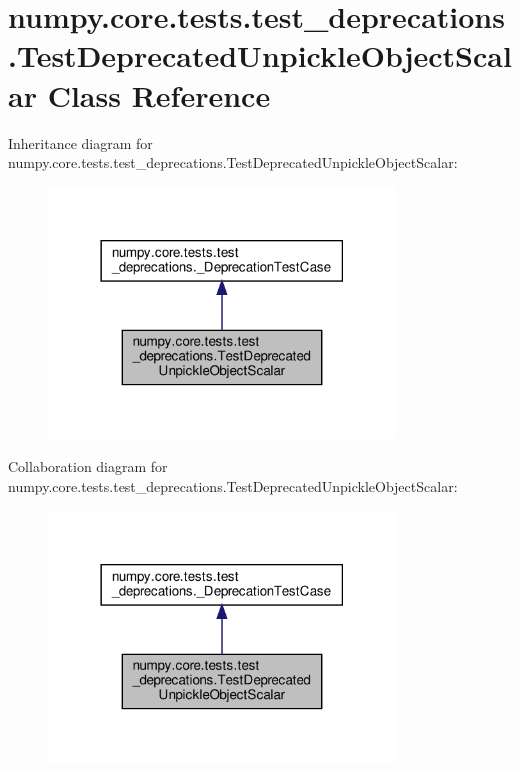 \hypertarget{classnumpy_1_1core_1_1tests_1_1test__deprecations_1_1TestDeprecatedUnpickleObjectScalar}{}\section{numpy.\+core.\+tests.\+test\+\_\+deprecations.\+Test\+Deprecated\+Unpickle\+Object\+Scalar Class Reference}
\label{classnumpy_1_1core_1_1tests_1_1test__deprecations_1_1TestDeprecatedUnpickleObjectScalar}


Inheritance diagram for numpy.\+core.\+tests.\+test\+\_\+deprecations.\+Test\+Deprecated\+Unpickle\+Object\+Scalar\+:
\nopagebreak
\begin{figure}[H]
\begin{center}
\leavevmode
\includegraphics[width=261pt]{classnumpy_1_1core_1_1tests_1_1test__deprecations_1_1TestDeprecatedUnpickleObjectScalar__inherit__graph}
\end{center}
\end{figure}


Collaboration diagram for numpy.\+core.\+tests.\+test\+\_\+deprecations.\+Test\+Deprecated\+Unpickle\+Object\+Scalar\+:
\nopagebreak
\begin{figure}[H]
\begin{center}
\leavevmode
\includegraphics[width=261pt]{classnumpy_1_1core_1_1tests_1_1test__deprecations_1_1TestDeprecatedUnpickleObjectScalar__coll__graph}
\end{center}
\end{figure}
